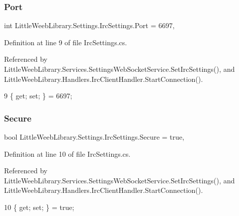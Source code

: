 \subsubsection{\texorpdfstring{Port}{Port}}
{\footnotesize\ttfamily int Little\+Weeb\+Library.\+Settings.\+Irc\+Settings.\+Port = 6697\hspace{0.3cm}{\ttfamily [get]}, {\ttfamily [set]}}



Definition at line 9 of file Irc\+Settings.\+cs.



Referenced by Little\+Weeb\+Library.\+Services.\+Settings\+Web\+Socket\+Service.\+Set\+Irc\+Settings(), and Little\+Weeb\+Library.\+Handlers.\+Irc\+Client\+Handler.\+Start\+Connection().


\begin{DoxyCode}
9 \{ \textcolor{keyword}{get}; \textcolor{keyword}{set}; \} = 6697;
\end{DoxyCode}
\mbox{\label{class_little_weeb_library_1_1_settings_1_1_irc_settings_aea7952c2d3db87eb5609feae15c5475c}} 
\subsubsection{\texorpdfstring{Secure}{Secure}}
{\footnotesize\ttfamily bool Little\+Weeb\+Library.\+Settings.\+Irc\+Settings.\+Secure = true\hspace{0.3cm}{\ttfamily [get]}, {\ttfamily [set]}}



Definition at line 10 of file Irc\+Settings.\+cs.



Referenced by Little\+Weeb\+Library.\+Services.\+Settings\+Web\+Socket\+Service.\+Set\+Irc\+Settings(), and Little\+Weeb\+Library.\+Handlers.\+Irc\+Client\+Handler.\+Start\+Connection().


\begin{DoxyCode}
10 \{ \textcolor{keyword}{get}; \textcolor{keyword}{set}; \} = \textcolor{keyword}{true};
\end{DoxyCode}
\mbox{\label{class_little_weeb_library_1_1_settings_1_1_irc_settings_a395d5d33ff9f9699551a38b4ab6866e4}} 
